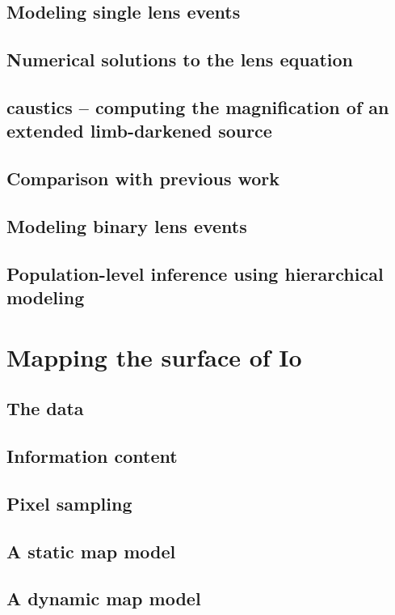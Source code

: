 \documentclass[12pt]{report}
\begin{document}
\section{Modeling single lens events}
\section{Numerical solutions to the lens equation}
\section{\textsf{caustics} -- computing the magnification of an extended limb-darkened source}
\section{Comparison with previous work}
\section{Modeling binary lens events}
\section{Population-level inference using hierarchical modeling}

\chapter{Mapping the surface of Io}
\label{ch:mapping_io}
\section{The data}
\section{Information content}
\section{Pixel sampling}
\section{A static map model}
\section{A dynamic map model}

\end{document}
